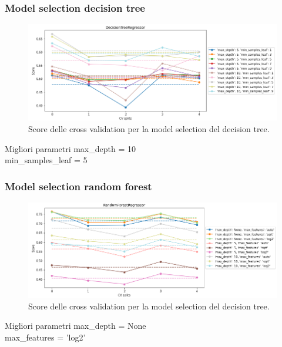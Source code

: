 \documentclass{beamer}
\begin{document}
\begin{frame}
	\frametitle{Model selection decision tree}
	\begin{figure}[ht]
		\centering
		\includegraphics[width=\textwidth]{treecv.png}
		\caption{Score delle cross validation per la model selection del decision
		tree.}
	\end{figure}
	\begin{alertblock}{Migliori parametri}
		max\_depth = 10\\
		min\_samples\_leaf = 5
	\end{alertblock}
\end{frame}

\begin{frame}
	\frametitle{Model selection random forest}
	\begin{figure}[ht]
		\centering
		\includegraphics[width=\textwidth]{ranfcv.png}
		\caption{Score delle cross validation per la model selection del decision
		tree.}
	\end{figure}
	\begin{alertblock}{Migliori parametri}
		max\_depth = None\\
		max\_features = 'log2'
	\end{alertblock}
\end{frame}
\end{document}
